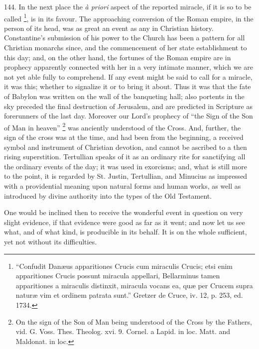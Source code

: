 144.
In the next place the \emph{à priori} aspect of the reported miracle,
if it is so to be called \footnote{``Confudit Danæus apparitiones Crucis cum miraculis Crucis; etsi enim
apparitiones Crucis possunt miracula appellari, Bellarminus tamen
apparitiones a miraculis distinxit, miracula vocans ea, quæ per
Crucem supra naturæ vim et ordinem patrata sunt.'' Gretzer de Cruce,
iv. 12, p. 253, ed. 1734.},
is in its favour. The approaching conversion of the Roman empire, in
the person of its head, was as great an event as any in Christian
history. Constantine's submission of his power to the Church has been
a pattern for all Christian monarchs since, and the commencement of
her state establishment to this day; and, on the other hand, the
fortunes of the Roman empire are in prophecy apparently connected with
her in a very intimate manner, which we are not yet able fully to
comprehend. If any event might be said to call for a miracle, it
was this; whether to signalize it or to bring it about. Thus it was
that the fate of Babylon was written on the wall of the banqueting
hall; also portents in the sky preceded the final destruction of
Jerusalem, and are predicted in Scripture as forerunners of the last
day. Moreover our Lord's prophecy of ``the Sign of the Son of Man in
heaven'' \footnote{On the sign of the Son of Man being understood of the Cross by the
Fathers, vid. G. Voss. Thes. Theolog. xvi. 9. Cornel. a Lapid. in loc.
Matt. and Maldonat. in loc.} was
anciently understood of the Cross. And, further, the sign of the cross
was at the time, and had been from the beginning, a received symbol
and instrument of Christian devotion, and cannot be ascribed to a then
rising superstition. Tertullian speaks of it as an ordinary rite for
sanctifying all the ordinary events of the day; it was used in
exorcisms; and, what is still more to the point, it is regarded by St.
Justin, Tertullian, and Minucius as impressed with a providential
meaning upon natural forms and human works, as well as introduced by
divine authority into the types of the Old Testament.

One would be inclined then to receive the
wonderful event in question on very slight evidence, if that evidence
were good as far as it went; and now let us see what, and of what
kind, is producible in its behalf. It is on the whole sufficient, yet
not without its difficulties.

